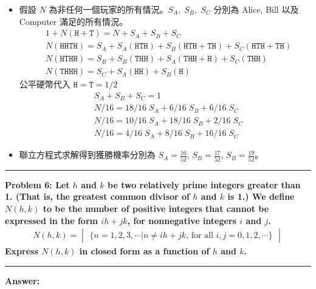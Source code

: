 \documentclass[11pt,fleqn]{article}
\newcommand\question[2]{\vspace{.25in}\hrule\textbf{#1: #2}\vspace{.5em}\hrule\vspace{.10in}}
\renewcommand\part[1]{\vspace{.10in}\textbf{#1}}
\begin{document}
\begin{itemize}
	\item 假設 $N$ 為非任何一個玩家的所有情況。$S_A, \; S_B, \; S_C$ 分別為 Alice, Bill 以及 Computer 
		滿足的所有情況。
		\begin{align*}
			& 1 + N (\texttt{H}+\texttt{T}) = N + S_A + S_B + S_C \\
			& N (\texttt{HHTH}) = S_A + S_A (\texttt{HTH}) 
									+ S_B (\texttt{HTH} + \texttt{TH})
									+ S_C(\texttt{HTH} + \texttt{TH}) \\
			& N (\texttt{HTHH}) = S_B + S_B (\texttt{THH}) 
									+ S_A (\texttt{THH} + \texttt{H})
									+ S_C(\texttt{THH}) \\
			& N (\texttt{THHH}) = S_C 
									+ S_A (\texttt{HH})
									+ S_B(\texttt{H}) 
		\end{align*}
		公平硬幣代入 $\texttt{H} = \texttt{T} = 1/2$
		\begin{align*}
			& S_A + S_B + S_C = 1 \\
			& N / 16 = 18 / 16 \; S_A + 6 / 16 \; S_B + 6 / 16 \; S_C \\
			& N / 16 = 10 / 16 \; S_A + 18 / 16 \; S_B + 2 / 16 \; S_C \\
			& N / 16 = 4 / 16 \; S_A + 8 / 16 \; S_B + 16 / 16 \; S_C
		\end{align*}
	\item
		聯立方程式求解得到獲勝機率分別為 $S_A = \frac{16}{52}$, $S_B = \frac{17}{52}$, $S_B = \frac{19}{52}$。
\end{itemize}

\newpage

\question{Problem 6}{Let $h$ and $k$ be two relatively prime integers greater than 1.
	(That is, the greatest common divisor of $h$ and $k$ is 1.) We define $N(h, k)$ to be
	the number of positive integers that \textbf{cannot} be expressed in the form 
	$ih + jk$, for nonnegative integers $i$ and $j$.
	\begin{align*}
		N(h, k) = \begin{vmatrix}
			\{n = 1, 2, 3, \cdots | n \neq ih + jk \text{, for all } i, j = 0, 1, 2, \cdots \}
		\end{vmatrix}
	\end{align*}
	Express $N(h, k)$ in closed form as a function of $h$ and $k$.
}

\part{Answer:}
\end{document}
